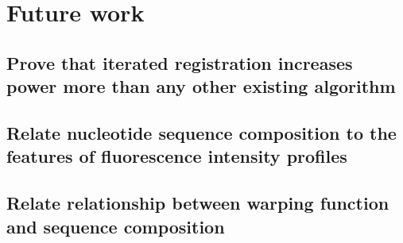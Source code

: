 \section{Future work}

\subsection{Prove that iterated registration increases power more than any other existing algorithm}

\subsection{Relate nucleotide sequence composition to the features of fluorescence intensity profiles}

\subsection{Relate relationship between warping function and sequence composition}


